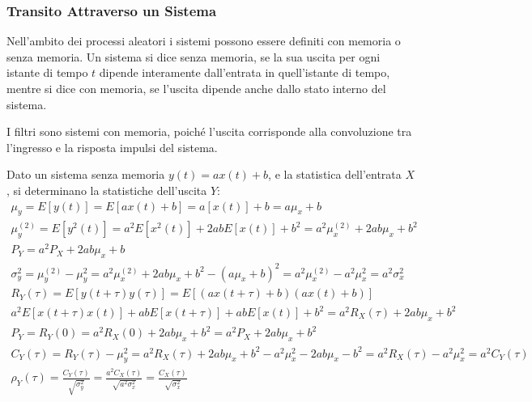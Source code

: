 \documentclass{article}
\numberwithin{equation}{subsection}
\begin{document}
\subsubsection{Transito Attraverso un Sistema}

Nell'ambito dei processi aleatori i sistemi possono essere definiti con memoria o senza memoria. Un sistema si dice senza memoria, se la sua uscita per ogni istante di 
tempo $t$ dipende interamente dall'entrata in quell'istante di tempo, mentre si dice con memoria, se l'uscita dipende anche dallo stato interno del sistema. 

I filtri sono sistemi con memoria, poiché l'uscita corrisponde alla convoluzione tra l'ingresso e la risposta impulsi del sistema. 

Dato un sistema senza memoria $y(t)=ax(t)+b$, e la statistica dell'entrata $X$, si determinano la statistiche dell'uscita $Y$:
\begin{gather*}
    \mu_y=E[y(t)]=E[ax(t)+b]=a[x(t)]+b=a\mu_x+b\\
    \mu_y^{(2)}=E[y^2(t)]=a^2E[x^2(t)]+2abE[x(t)]+b^2=a^2\mu_x^{(2)}+2ab\mu_x+b^2\\
    P_Y=a^2P_X+2ab\mu_x+b
\end{gather*}
\begin{gather*}
    \sigma_y^2=\mu_y^{(2)}-\mu_y^2=a^2\mu_x^{(2)}+2ab\mu_x+b^2-(a\mu_x+b)^2=a^2\mu_x^{(2)}-a^2\mu_x^2=a^2\sigma_x^2\\
    R_Y(\tau)=E[y(t+\tau)y(\tau)]=E[(ax(t+\tau)+b)(ax(t)+b)]\\
    a^2E[x(t+\tau)x(t)]+abE[x(t+\tau)]+abE[x(t)]+b^2=a^2R_X(\tau)+2ab\mu_x+b^2\\
    P_Y=R_Y(0)=a^2R_X(0)+2ab\mu_x+b^2=a^2P_X+2ab\mu_x+b^2\\
    C_Y(\tau)=R_Y(\tau)-\mu_y^2=a^2R_X(\tau)+2ab\mu_x+b^2-a^2\mu_x^2-2ab\mu_x-b^2=a^2R_X(\tau)-a^2\mu_x^2=a^2C_Y(\tau)\\
    \rho_Y(\tau)=\displaystyle\frac{C_Y(\tau)}{\sqrt{\sigma_y^2}}=\frac{a^2C_X(\tau)}{\sqrt{a^2\sigma_x^2}}=\frac{C_X(\tau)}{\sqrt{\sigma_x^2}}
\end{gather*}
\end{document}
